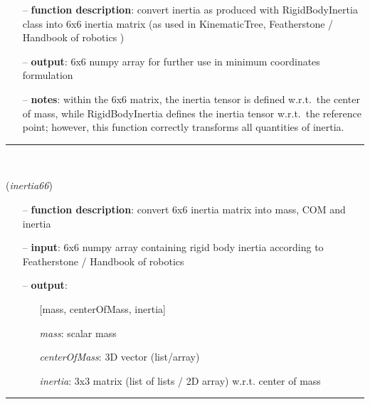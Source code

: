 \begin{itemize}[leftmargin=1.4cm]
\begin{itemize}[leftmargin=0.5cm]
\begin{itemize}[leftmargin=1.4cm]
\begin{itemize}[leftmargin=0.5cm]
\begin{itemize}[leftmargin=1.4cm]
\begin{itemize}[leftmargin=0.5cm]
\begin{itemize}[leftmargin=1.4cm]
\begin{itemize}[leftmargin=1.4cm]
\begin{itemize}[leftmargin=1.4cm]
\begin{itemize}[leftmargin=0.7cm]
  \item[--]  {\bf function description}: convert inertia as produced with RigidBodyInertia class into 6x6 inertia matrix (as used in KinematicTree, Featherstone / Handbook of robotics \cite{Siciliano2016})  \item[--]  {\bf output}: 6x6 numpy array for further use in minimum coordinates formulation  \item[--]  {\bf notes}: within the 6x6 matrix, the inertia tensor is defined w.r.t.\ the center of mass, while RigidBodyInertia defines the inertia tensor w.r.t.\ the reference point; however, this function correctly transforms all quantities of inertia.\vspace{12pt}\end{itemize}
%
\noindent\rule{8cm}{0.75pt}\vspace{1pt} \\ 
\begin{flushleft}
\label{sec:kinematicTree:Inertia66toMassCOMinertia}
({\it inertia66})
\end{flushleft}
\setlength{\itemindent}{0.7cm}
\begin{itemize}[leftmargin=0.7cm]
  \item[--]  {\bf function description}: convert 6x6 inertia matrix into mass, COM and inertia  \item[--]  {\bf input}: 6x6 numpy array containing rigid body inertia according to Featherstone / Handbook of robotics \cite{Siciliano2016}  \item[--]  {\bf output}: \vspace{-6pt}
  \begin{itemize}[leftmargin=1.2cm]
\setlength{\itemindent}{-0.7cm}
    \item[] [mass, centerOfMass, inertia]
    \item[] {\it   mass}: scalar mass
    \item[] {\it   centerOfMass}: 3D vector (list/array)
    \item[] {\it   inertia}: 3x3 matrix (list of lists / 2D array) w.r.t. center of mass
  \end{itemize}
\vspace{12pt}\end{itemize}
%
\noindent\rule{8cm}{0.75pt}\vspace{1pt} \\ 

\end{itemize}
\end{itemize}
\end{itemize}
\end{itemize}
\end{itemize}
\end{itemize}
\end{itemize}
\end{itemize}
\end{itemize}

